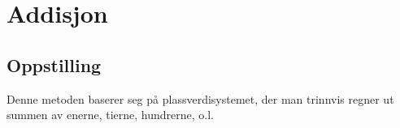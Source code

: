 



\section{Addisjon}

\subsection{Oppstilling}
Denne metoden baserer seg på plassverdisystemet, der man trinnvis regner ut summen av enerne, tierne, hundrerne, o.l.
\begin{center}
	\parbox{0.3\linewidth}{
}\qquad
\parbox{0.3\linewidth}{
}\\[12pt]
\parbox{0.3\linewidth}{
}\qquad
\parbox{0.3\linewidth}{
}
\end{center}

